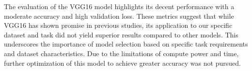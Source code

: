 The evaluation of the VGG16 model highlights its decent performance with a moderate accuracy and high validation loss. These metrics suggest that while VGG16 has shown promise in previous studies, its application to our specific dataset and task did not yield superior results compared to other models. This underscores the importance of model selection based on specific task requirements and dataset characteristics. Due to the limitations of compute power and time, further optimization of this model to achieve greater accuracy was not pursued.

